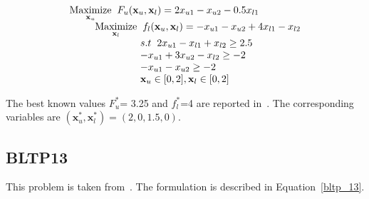 \begin{equation}
\begin{array}{lr}
\underset{\mathbf{x}_u}{\text{Maximize}}\hspace{2mm} F_u(\mathbf{x}_u, \mathbf{ x}_l)=2x_{u1}-x_{u2}-0.5x_{l1}\\
\hspace{9mm} \underset{\mathbf{x}_l} {\text{Maximize}}\hspace{2mm}f_l(\mathbf{x}_u, \mathbf{x}_l)=-x_{u1}-x_{u2}+4x_{l1}-x_{l2}\\

\hspace{25mm}s.t\hspace{2mm} 2x_{u1}-x_{l1}+x_{l2}\geq 2.5\\

\hspace{25mm}  -x_{u1}+3x_{u2}-x_{l2} \geq -2\\
\hspace{25mm}  -x_{u1}-x_{u2} \geq -2\\
\hspace{25mm} \mathbf{x}_u \in {[0,2]},\mathbf{x}_l \in [0,2] \\
\end{array}
\label{bltp_12}
\end{equation}

The best known values $F_u^*$= 3.25 and  $f_l^*$=4 are reported in~\cite{Angelobilevel}. The corresponding variables are $(\mathbf{x}^*_u, \mathbf{x}^*_l)=(2,0,1.5,0)$.

\subsection{BLTP13}

This problem is taken from~\cite{candler1982linear}. The formulation is described in Equation~\ref{bltp_13}.

